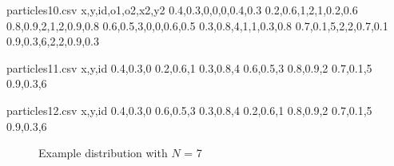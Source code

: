 \documentclass[]{article}
\begin{document}
\begin{filecontents*}{particles10.csv}
x,y,id,o1,o2,x2,y2
0.4,0.3,0,0,0,0.4,0.3
0.2,0.6,1,2,1,0.2,0.6
0.8,0.9,2,1,2,0.9,0.8
0.6,0.5,3,0,0,0.6,0.5
0.3,0.8,4,1,1,0.3,0.8
0.7,0.1,5,2,2,0.7,0.1
0.9,0.3,6,2,2,0.9,0.3
\end{filecontents*}

\begin{filecontents*}{particles11.csv}
	x,y,id
	0.4,0.3,0
	0.2,0.6,1
	0.3,0.8,4
	0.6,0.5,3
	0.8,0.9,2
	0.7,0.1,5
	0.9,0.3,6
\end{filecontents*}


\begin{filecontents*}{particles12.csv}
	x,y,id
	0.4,0.3,0
	0.6,0.5,3
	0.3,0.8,4
	0.2,0.6,1
	0.8,0.9,2
	0.7,0.1,5
	0.9,0.3,6
\end{filecontents*}

\begin{figure}[H]
    \begin{center}
        \begin{minipage}[c]{0.2\linewidth}
        \end{minipage}
        \begin{minipage}[c]{0.7\linewidth}
        \end{minipage}
    \end{center}
\caption{Example distribution with $N$ = 7}
\end{figure}
\end{document}
